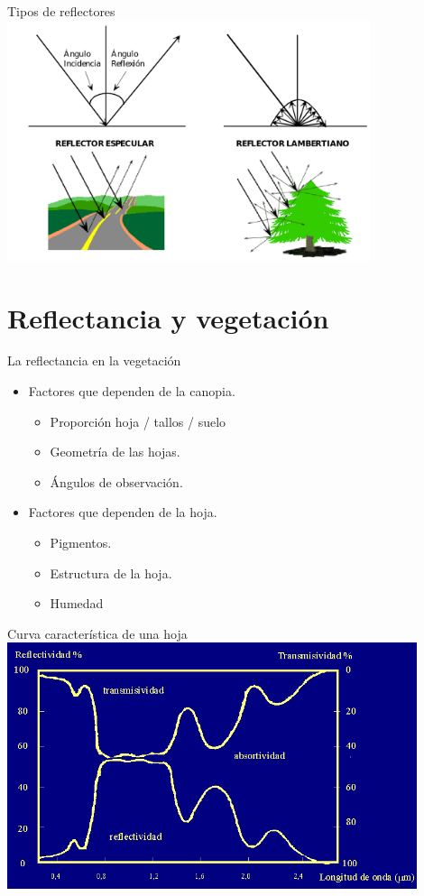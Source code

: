 \documentclass{beamer}
\begin{document}
\begin{frame}{Tipos de reflectores}
	\centering
	\includegraphics[width=0.8\textwidth]{IMGs/reflectores}
\end{frame}

\section{Reflectancia y vegetación}

\begin{frame}{La reflectancia en la vegetación}
	\begin{itemize}
		\item Factores que dependen de la canopia.
		\begin{itemize}
			\item Proporción hoja / tallos / suelo
			\item Geometría de las hojas.
			\item Ángulos de observación.
		\end{itemize}
		\item Factores que dependen de la hoja.
		\begin{itemize}
			\item Pigmentos.
			\item Estructura de la hoja.
			\item Humedad
		\end{itemize}
	\end{itemize}
\end{frame}

\begin{frame}{Curva característica de una hoja}
	\centering
	\includegraphics[width=0.9\textwidth]{IMGs/curvahoja}
\end{frame}
\end{document}
